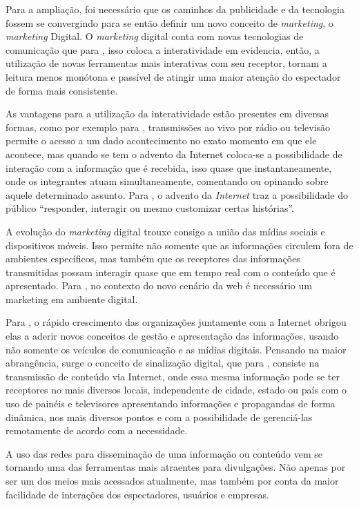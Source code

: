 Para a ampliação, foi necessário que os caminhos da publicidade e da tecnologia fossem se convergindo para se então definir um novo conceito de \textit{marketing}, o \textit{marketing} Digital. O \textit{marketing} digital conta com novas tecnologias de comunicação que para \cite[p.2]{escobar2007}, isso coloca a interatividade em evidencia, então, a utilização de novas ferramentas mais interativas com seu receptor, tornam a leitura menos monótona e passível de atingir uma maior atenção do espectador de forma mais consistente.  

As vantagens para a utilização da interatividade estão presentes em diversas formas, como por exemplo para \cite[p.4]{escobar2007}, transmissões ao vivo por rádio ou televisão permite o acesso a um dado acontecimento no exato momento em que ele acontece, mas quando se tem o advento da Internet coloca-se a possibilidade de interação com a informação que é recebida, isso quase que instantaneamente, onde os integrantes atuam simultaneamente, comentando ou opinando sobre aquele determinado assunto. Para \cite{deuze2002}, o advento da \textit{Internet} traz a possibilidade do público ``responder, interagir ou mesmo customizar certas histórias''. 

A evolução do \textit{marketing} digital trouxe consigo a união das mídias sociais e dispositivos móveis. Isso permite não somente que as informações circulem fora de ambientes específicos, mas também que os receptores das informações transmitidas possam interagir quase que em tempo real com o conteúdo que é apresentado. Para \cite{santos2014}, no contexto do novo cenário da web é necessário um marketing em ambiente digital.

Para \cite[p.7]{machado2010}, o rápido crescimento das organizações juntamente com a Internet obrigou elas a aderir novos conceitos de gestão e apresentação das informações, usando não somente os veículos de comunicação e as mídias digitais. Pensando na maior abrangência, surge o conceito de sinalização digital, que para \cite[p.37]{machado2010}, consiste na transmissão de conteúdo via Internet, onde essa mesma informação pode se ter receptores no mais diversos locais, independente de cidade, estado ou país com o uso de painéis e televisores apresentando informações e propagandas de forma dinâmica, nos mais diversos pontos e com a possibilidade de gerenciá-las remotamente de acordo com a necessidade. 

A uso das redes para disseminação de uma informação ou conteúdo vem se tornando uma das ferramentas mais atraentes para divulgações. Não apenas por ser um dos meios mais acessados atualmente, mas também por conta da maior facilidade de interações dos espectadores, usuários e empresas. 

